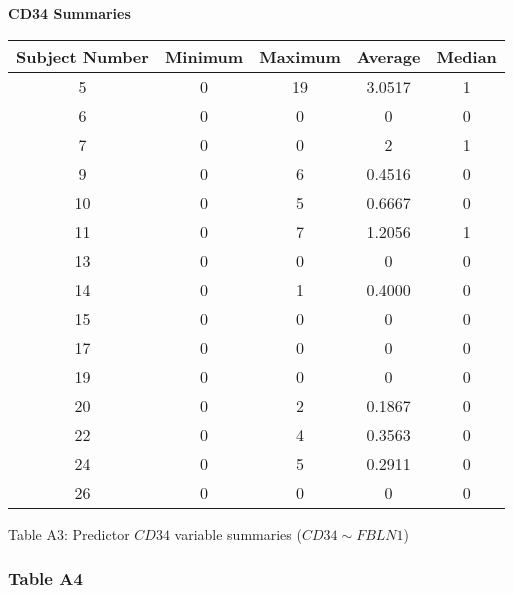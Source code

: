 \documentclass[12pt,]{article}
\begin{document}
\begin{center}

\textbf{\large{CD34 Summaries}}


\begin{tabular}{|c|c|c|c|c|}
\hline 
Subject Number & Minimum & Maximum & Average & Median \\ 
\hline
\hline
5  & 0 & 19 & 3.0517 & 1 \\ 
\hline 
6  & 0 & 0 & 0 & 0 \\ 
\hline 
7  & 0 & 0 & 2 & 1 \\ 
\hline 
9  & 0 & 6 & 0.4516 & 0 \\ 
\hline 
10 & 0 & 5 & 0.6667 & 0 \\ 
\hline 
11 & 0 & 7 & 1.2056 & 1 \\ 
\hline 
13 & 0 & 0 & 0 & 0 \\ 
\hline 
14 & 0 & 1 & 0.4000 & 0 \\ 
\hline 
15 & 0 & 0 & 0 & 0 \\ 
\hline 
17 & 0 & 0 & 0 & 0 \\ 
\hline 
19 & 0 & 0 & 0 & 0 \\ 
\hline 
20 & 0 & 2 & 0.1867 & 0 \\ 
\hline 
22 & 0 & 4 & 0.3563 & 0 \\ 
\hline 
24 & 0 & 5 & 0.2911 & 0 \\ 
\hline 
26 & 0 & 0 & 0 & 0 \\  
\hline
\end{tabular}

\vspace{5pt}

Table A3: Predictor $CD34$ variable summaries ($CD34 \sim FBLN1$)

\end{center}

\newpage

\hypertarget{table-a4}{%
\subsubsection{Table A4}\label{table-a4}}
\end{document}
